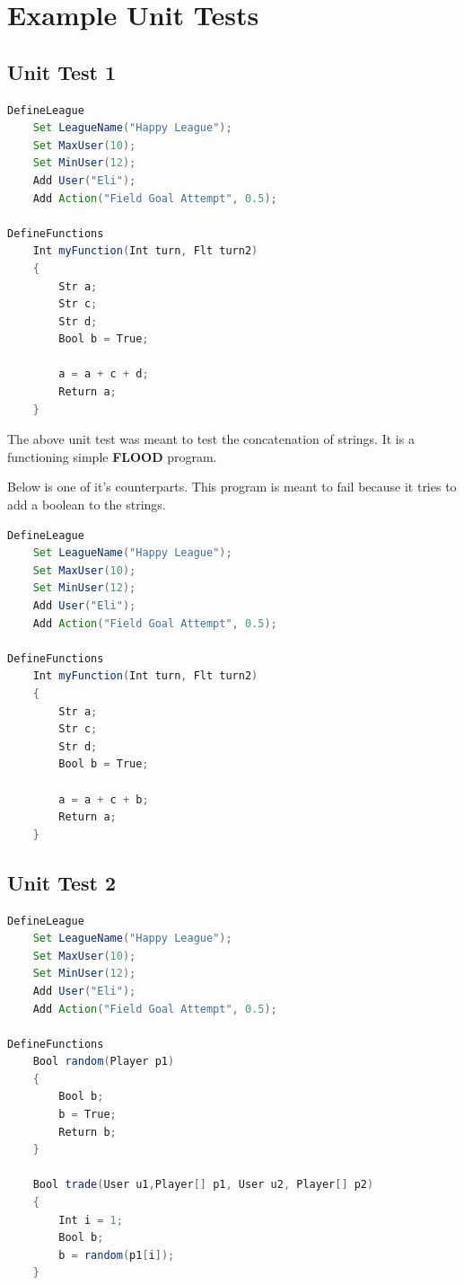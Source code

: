 \documentclass[12pt]{report}
\begin{document}
\section{Example Unit Tests}

\subsection{Unit Test 1}

\begin{singlespace}
\begin{lstlisting}[language=Java,label=some-code,caption={arithmetic$\_$test.fld}]
DefineLeague
	Set LeagueName("Happy League");
	Set MaxUser(10);
	Set MinUser(12);
	Add User("Eli");
	Add Action("Field Goal Attempt", 0.5);

DefineFunctions
	Int myFunction(Int turn, Flt turn2)
	{
		Str a;
		Str c;
		Str d;
		Bool b = True;

		a = a + c + d;		
		Return a;
	}
\end{lstlisting}
\end{singlespace}

The above unit test was meant to test the concatenation of strings. It is a functioning simple \textbf{FLOOD} program.

Below is one of it's counterparts. This program is meant to fail because it tries to add a boolean to the strings.

\begin{singlespace}
\begin{lstlisting}[language=Java,label=some-code,caption={arithmetic$\_$test.fld}]
DefineLeague
	Set LeagueName("Happy League");
	Set MaxUser(10);
	Set MinUser(12);
	Add User("Eli");
	Add Action("Field Goal Attempt", 0.5);

DefineFunctions
	Int myFunction(Int turn, Flt turn2)
	{
		Str a;
		Str c;
		Str d;
		Bool b = True;

		a = a + c + b;		
		Return a;
	}
\end{lstlisting}
\end{singlespace}

\subsection{Unit Test 2}

\begin{singlespace}
\begin{lstlisting}[language=Java,label=some-code,caption={array$\_$var$\_$index.fld}]
DefineLeague
	Set LeagueName("Happy League");
	Set MaxUser(10);
	Set MinUser(12);
	Add User("Eli");
	Add Action("Field Goal Attempt", 0.5);

DefineFunctions
	Bool random(Player p1)
	{
		Bool b;
		b = True;
		Return b;
	}

	Bool trade(User u1,Player[] p1, User u2, Player[] p2)
	{
		Int i = 1;
		Bool b;
		b = random(p1[i]);
	}
\end{lstlisting}
\end{singlespace}
\end{document}

